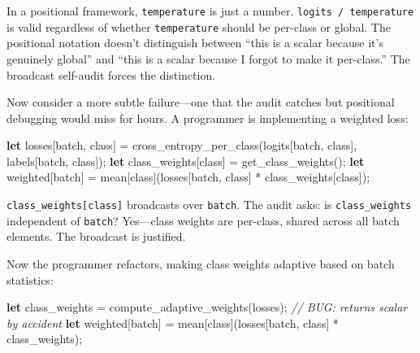\documentclass[11pt,titlepage]{article}
\newenvironment{Shaded}{}{}
\newcommand{\CommentTok}[1]{\textcolor[rgb]{0.38,0.63,0.69}{\textit{#1}}}
\newcommand{\KeywordTok}[1]{\textcolor[rgb]{0.00,0.44,0.13}{\textbf{#1}}}
\newcommand{\NormalTok}[1]{#1}
\newcommand{\OperatorTok}[1]{\textcolor[rgb]{0.40,0.40,0.40}{#1}}
\begin{document}
In a positional framework, \texttt{temperature} is just a number.
\texttt{logits\ /\ temperature} is valid regardless of whether
\texttt{temperature} should be per-class or global. The positional
notation doesn't distinguish between ``this is a scalar because it's
genuinely global'' and ``this is a scalar because I forgot to make it
per-class.'' The broadcast self-audit forces the distinction.

Now consider a more subtle failure---one that the audit catches but
positional debugging would miss for hours. A programmer is implementing
a weighted loss:

\begin{Shaded}
\begin{Highlighting}[]
\KeywordTok{let}\NormalTok{ losses}\OperatorTok{[}\NormalTok{batch, class}\OperatorTok{]}\NormalTok{ = cross_entropy_per_class(logits}\OperatorTok{[}\NormalTok{batch, class}\OperatorTok{]}\NormalTok{, labels}\OperatorTok{[}\NormalTok{batch, class}\OperatorTok{]}\NormalTok{);}
\KeywordTok{let}\NormalTok{ class_weights}\OperatorTok{[}\NormalTok{class}\OperatorTok{]}\NormalTok{ = get_class_weights();}
\KeywordTok{let}\NormalTok{ weighted}\OperatorTok{[}\NormalTok{batch}\OperatorTok{]}\NormalTok{ = mean}\OperatorTok{[}\NormalTok{class}\OperatorTok{]}\NormalTok{(losses}\OperatorTok{[}\NormalTok{batch, class}\OperatorTok{]}\NormalTok{ * class_weights}\OperatorTok{[}\NormalTok{class}\OperatorTok{]}\NormalTok{);}
\end{Highlighting}
\end{Shaded}

\texttt{class\_weights{[}class{]}} broadcasts over \texttt{batch}. The
audit asks: is \texttt{class\_weights} independent of \texttt{batch}?
Yes---class weights are per-class, shared across all batch elements. The
broadcast is justified.

Now the programmer refactors, making class weights adaptive based on
batch statistics:

\begin{Shaded}
\begin{Highlighting}[]
\KeywordTok{let}\NormalTok{ class_weights = compute_adaptive_weights(losses);  }\CommentTok{// BUG: returns scalar by accident}
\KeywordTok{let}\NormalTok{ weighted}\OperatorTok{[}\NormalTok{batch}\OperatorTok{]}\NormalTok{ = mean}\OperatorTok{[}\NormalTok{class}\OperatorTok{]}\NormalTok{(losses}\OperatorTok{[}\NormalTok{batch, class}\OperatorTok{]}\NormalTok{ * class_weights);}
\end{Highlighting}
\end{Shaded}
\end{document}
